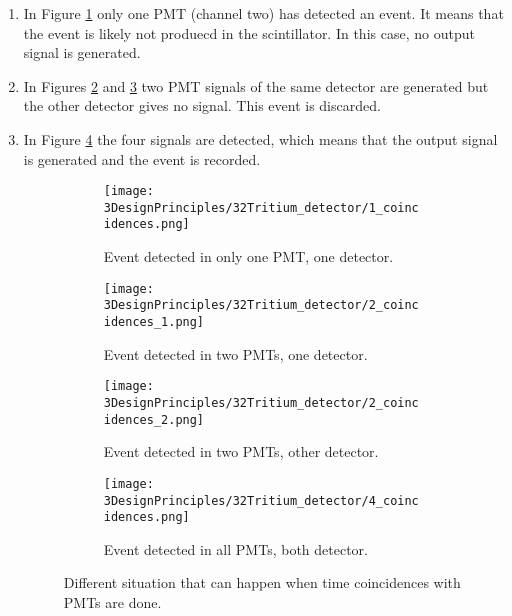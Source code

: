 \begin{enumerate}
\begin{enumerate}
\begin{enumerate}
\item{} In Figure \ref{subfig:signalInOnePMT} only one PMT (channel two) has detected an event. It means that the event is likely not produecd in the scintillator. In this case, no output signal is generated.

\item{} In Figures \ref{subfig:signalInTwoPMTOneDetector} and \ref{subfig:signalInTwoPMTOtherDetector} two PMT signals of the same detector are generated but the other detector gives no signal. This event is discarded.

\item{} In Figure \ref{subfig:signalInAllPMTsBothDetector} the four signals are detected, which means that the output signal is generated and the event is recorded.

\begin{figure}
\centering
    \begin{subfigure}[b]{0.45\textwidth}
    \centering
    \texttt{[image: 3DesignPrinciples/32Tritium\_detector/1\_coincidences.png]}  
    \caption{Event detected in only one PMT, one detector.\label{subfig:signalInOnePMT}}
    \end{subfigure}
    \hfill
    \begin{subfigure}[b]{0.45\textwidth}
    \centering
    \texttt{[image: 3DesignPrinciples/32Tritium\_detector/2\_coincidences\_1.png]}  
    \caption{Event detected in two PMTs, one detector.\label{subfig:signalInTwoPMTOneDetector}}
    \end{subfigure}
    \hfill
    \begin{subfigure}[b]{0.45\textwidth}
    \centering
    \texttt{[image: 3DesignPrinciples/32Tritium\_detector/2\_coincidences\_2.png]}  
    \caption{Event detected in two PMTs, other detector.\label{subfig:signalInTwoPMTOtherDetector}}
    \end{subfigure}
    \hfill
    \begin{subfigure}[b]{0.45\textwidth}
    \centering
    \texttt{[image: 3DesignPrinciples/32Tritium\_detector/4\_coincidences.png]}  
    \caption{Event detected in all PMTs, both detector.\label{subfig:signalInAllPMTsBothDetector}}
    \end{subfigure}
 \caption{Different situation that can happen when time coincidences with PMTs are done.}
 \label{fig:DifferentCoincidences}
\end{figure}


\end{enumerate}
\end{enumerate}
\end{enumerate}
